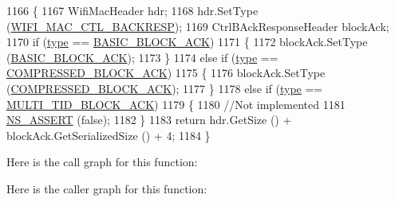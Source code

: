 \begin{DoxyCode}
1166 \{
1167   WifiMacHeader hdr;
1168   hdr.SetType (\hyperlink{namespacens3_a9318472db39b35b2092de5c721e6ab0aaabd6e2bca4aa9279211a5e7d0c5c5afa}{WIFI\_MAC\_CTL\_BACKRESP});
1169   CtrlBAckResponseHeader blockAck;
1170   \textcolor{keywordflow}{if} (\hyperlink{visualizer-ideas_8txt_add98db9e15e2a58cf2b57623e7aa893a}{type} == \hyperlink{namespacens3_a90f436472d19d7d7f37cbf0b8c288ff7a118b16b614e89a911b77a167632f89bf}{BASIC\_BLOCK\_ACK})
1171     \{
1172       blockAck.SetType (\hyperlink{namespacens3_a90f436472d19d7d7f37cbf0b8c288ff7a118b16b614e89a911b77a167632f89bf}{BASIC\_BLOCK\_ACK});
1173     \}
1174   \textcolor{keywordflow}{else} \textcolor{keywordflow}{if} (\hyperlink{visualizer-ideas_8txt_add98db9e15e2a58cf2b57623e7aa893a}{type} == \hyperlink{namespacens3_a90f436472d19d7d7f37cbf0b8c288ff7ad325114ff6e0d84c1d4cea5bd810a48c}{COMPRESSED\_BLOCK\_ACK})
1175     \{
1176       blockAck.SetType (\hyperlink{namespacens3_a90f436472d19d7d7f37cbf0b8c288ff7ad325114ff6e0d84c1d4cea5bd810a48c}{COMPRESSED\_BLOCK\_ACK});
1177     \}
1178   \textcolor{keywordflow}{else} \textcolor{keywordflow}{if} (\hyperlink{visualizer-ideas_8txt_add98db9e15e2a58cf2b57623e7aa893a}{type} == \hyperlink{namespacens3_a90f436472d19d7d7f37cbf0b8c288ff7a2b0db78cd77aa4769690b7b6aac6f017}{MULTI\_TID\_BLOCK\_ACK})
1179     \{
1180       \textcolor{comment}{//Not implemented}
1181       \hyperlink{assert_8h_a6dccdb0de9b252f60088ce281c49d052}{NS\_ASSERT} (\textcolor{keyword}{false});
1182     \}
1183   \textcolor{keywordflow}{return} hdr.GetSize () + blockAck.GetSerializedSize () + 4;
1184 \}
\end{DoxyCode}


Here is the call graph for this function\+:




Here is the caller graph for this function\+:


